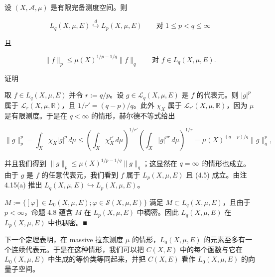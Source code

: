 \begin{theorem}

设 $ (X, \mathcal{A}, \mu) $ 是有限完备测度空间。则

\[
L_q(X, \mu, E) \overset{d}{\hookrightarrow} L_p(X, \mu, E) \qquad \text{对 } 1 \le p < q \le \infty
\]

且

\begin{equation}
\|f\|_p \le \mu(X)^{1/p-1/q} \|f\|_q \qquad \text{对 } f \in L_q(X, \mu, E) .\tag{4.5}
\end{equation}

证明

\begin{subitems}
\item

取 $ f \in L_q(X, \mu, E) $ 并令 $ r := q/p $。设 $ g \in \mathcal{L}_q(X, \mu, E) $ 是 $ f $ 的代表元。则 $ |g|^p $ 属于 $ \mathcal{L}_r(X, \mu, \mathbb{R}) $，且 $ 1/r' = (q-p)/q $。此外 $ \chi_X $ 属于 $ \mathcal{L}_{r'}(X, \mu, \mathbb{R}) $，因为 $ \mu $ 是有限测度。于是在 $ q < \infty $ 的情形，赫尔德不等式给出

\[
\|g\|_p^p = \int_X \chi_X |g|^p \, d\mu \le \left( \int_X \chi_X^{r'} \, d\mu \right)^{1/r'} \left( \int_X |g|^{pr} \, d\mu \right)^{1/r} = \mu(X)^{(q-p)/q} \|g\|_q^p ,
\]

并且我们得到 $ \|g\|_p \le \mu(X)^{1/p-1/q} \|g\|_q $；这显然在 $ q = \infty $ 的情形也成立。由于 $ g $ 是 $ f $ 的任意代表元，我们看到 $ f $ 属于 $ L_p(X, \mu, E) $ 且 (4.5) 成立。由注 4.15(a) 推出 $ L_q(X, \mu, E) \hookrightarrow L_p(X, \mu, E) $。

\item

$ M := \{ [\varphi] \in L_0(X, \mu, E) ; \varphi \in \mathcal{S}(X, \mu, E) \} $ 满足 $ M \subset L_q(X, \mu, E) $，且由于 $ p < \infty $，命题 4.8 蕴含 $ M $ 在 $ L_p(X, \mu, E) $ 中稠密。因此 $ L_q(X, \mu, E) $ 在 $ L_p(X, \mu, E) $ 中也稠密。\nobreak\hspace{0.35em}■

\end{subitems}

\end{theorem}

下一个定理表明，在 massive 拉东测度 $ \mu $ 的情形，$ L_0(X, \mu, E) $ 的元素至多有一个连续代表元。于是在这种情形，我们可以把 $ C(X, E) $ 中的每个函数与它在 $ L_0(X, \mu, E) $ 中生成的等价类等同起来，并把 $ C(X, E) $ 看作 $ L_0(X, \mu, E) $ 的向量子空间。

